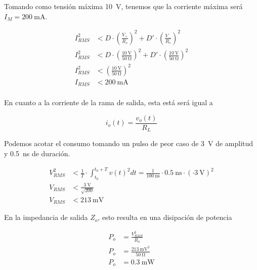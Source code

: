 Tomando como tensión máxima \qty{10}{\volt}, tenemos que la corriente máxima será
$I_M = \qty{200}{\milli\ampere}$.

\begin{equation}
    \begin{aligned}
        I_{RMS}^2 &< D \cdot \left( \frac{V_+}{R_s} \right) ^2 + D' \cdot
        \left( \frac{V_-}{R_s} \right) ^2 \\
        I_{RMS}^2 &< D \cdot \left( \frac{\qty{10}{\volt}}{\qty{50}{\ohm}} \right) ^2 + D' \cdot
        \left( \frac{\qty{10}{\volt}}{\qty{50}{\ohm}} \right) ^2 \\
        I_{RMS}^2 &< \left( \frac{\qty{10}{\volt}}{\qty{50}{\ohm}} \right) ^2  \\
        I_{RMS} &< \qty{200}{\milli\ampere} \\
    \end{aligned}
\end{equation}

En cuanto a la corriente de la rama de salida, esta está será igual a

\begin{equation}
    i_o(t) = \frac{v_o(t)}{R_L}
\end{equation}

Podemos acotar el consumo tomando un pulso de peor caso de \qty{3}{\volt} de
amplitud y \qty{0.5}{\nano\second} de duración.

\begin{equation}
    \begin{aligned}
        V_{RMS}^2 &< \frac{1}{T} \cdot \int_{t_0}^{t_0+T} v(t)^2dt =
        \frac{1}{\qty{100}{\nano\second}} \cdot \qty{0.5}{\nano\second} \cdot
        \left( \cdot \qty{3}{\volt} \right )^2 \\
        V_{RMS} &< \frac{\qty{3}{\volt}}{\sqrt{200}} \\
        V_{RMS} &< \qty{213}{\milli\volt}
    \end{aligned}
\end{equation}

En la impedancia de salida $Z_o$, esto resulta en una disipación de potencia

\begin{equation}
    \begin{aligned}
        P_{o} &= \frac{V_{RMS}^2}{R_o} \\
        P_{o} &= \frac{ \qty{213}{\milli\volt}^2}{ \qty{50}{\ohm}} \\
        P_{o} &= \qty{0.3}{\milli\watt} \\
    \end{aligned}
\end{equation}

